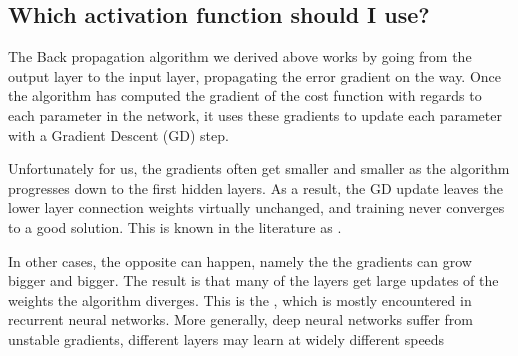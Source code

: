 \documentclass[letterpaper,10pt,english]{sphinxmanual}
\begin{document}
\begin{sphinxVerbatim}[commandchars=\\\{\}]
      
   
\end{sphinxVerbatim}


\subsection{Which activation function should I use?}
\label{\detokenize{chapter6:which-activation-function-should-i-use}}
The Back propagation algorithm we derived above works by going from
the output layer to the input layer, propagating the error gradient on
the way. Once the algorithm has computed the gradient of the cost
function with regards to each parameter in the network, it uses these
gradients to update each parameter with a Gradient Descent (GD) step.

Unfortunately for us, the gradients often get smaller and smaller as the
algorithm progresses down to the first hidden layers. As a result, the
GD update leaves the lower layer connection weights
virtually unchanged, and training never converges to a good
solution. This is known in the literature as
.

In other cases, the opposite can happen, namely the the gradients can grow bigger and
bigger. The result is that many of the layers get large updates of the
weights the
algorithm diverges. This is the , which is
mostly encountered in recurrent neural networks. More generally, deep
neural networks suffer from unstable gradients, different layers may
learn at widely different speeds
\end{document}
